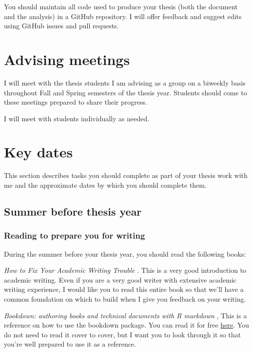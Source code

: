 \documentclass[
]{book}
\begin{document}
You should maintain all code used to produce your thesis (both the document and the analysis) in a GitHub repository. I will offer feedback and suggest edits using GitHub issues and pull requests.

\hypertarget{advising-meetings}{%
\chapter{Advising meetings}\label{advising-meetings}}

I will meet with the thesis students I am advising as a group on a biweekly basis throughout Fall and Spring semesters of the thesis year. Students should come to these meetings prepared to share their progress.

I will meet with students individually as needed.

\hypertarget{key-dates}{%
\chapter{Key dates}\label{key-dates}}

This section describes tasks you should complete as part of your thesis work with me and the approximate dates by which you should complete them.

\hypertarget{summer-before-thesis-year}{%
\section{Summer before thesis year}\label{summer-before-thesis-year}}

\hypertarget{reading-to-prepare-you-for-writing}{%
\subsection{Reading to prepare you for writing}\label{reading-to-prepare-you-for-writing}}

During the summer before your thesis year, you should read the following books:

\emph{How to Fix Your Academic Writing Trouble} \citep{mewburn2018ebook}. This is a very good introduction to academic writing. Even if you are a very good writer with extensive academic writing experience, I would like you to read this entire book so that we'll have a common foundation on which to build when I give you feedback on your writing.

\emph{Bookdown: authoring books and technical documents with R markdown} \citep{xie2016bookdown}, This is a reference on how to use the bookdown package. You can read it for free \href{https://bookdown.org/yihui/bookdown/}{here}. You do not need to read it cover to cover, but I want you to look through it so that you're well prepared to use it as a reference.
\end{document}
